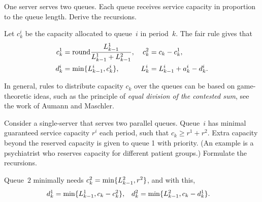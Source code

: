 \documentclass[queueing-book.tex]{subfiles}
\begin{document}
\begin{exercise} \label{ex:51}
 One server serves two queues. 
 Each queue receives service capacity in proportion to the queue length.
 Derive the recursions.
\begin{solution}
 Let $c_k^i$ be the capacity allocated to queue~$i$ in period~$k$. The fair rule gives that
 \begin{align*}
 c_k^1 &= \text{round} \frac{L_{k-1}^1}{L_{k-1}^1 + L_{k-1}^2}, &  c_k^2 &= c_k - c_k^1, \\
 d_k^i &= \min\{L_{k-1}^i, c^i_k\}, & L_k^i &= L_{k-1}^i+a_k^i - d_k^i.
 \end{align*}

 In general, rules to distribute capacity $c_k$ over the queues can be based on game-theoretic ideas, such as the principle of \textit{equal division of the contested sum}, see the work of  Aumann and Maschler.
\end{solution}
\end{exercise}


\begin{exercise}
 Consider  a single-server that serves two parallel queues.
Queue~$i$ has minimal guaranteed service capacity $r^i$ each  period, such that $c_k \geq r^1 + r^2$.
 Extra capacity beyond the reserved capacity is given to queue 1 with priority.
(An example is a psychiatrist who reserves capacity for different  patient groups.)
 Formulate the recursions.
\begin{solution}
  Queue~$2$ minimally needs $c_{k}^2 = \min\{L_{k-1}^2, r^2\}$, and with this,
  \begin{align*}
 d_{k}^1 &= \min\{L_{k-1}^1, c_k-c_{k}^2\}, & d_{k}^2 &= \min\{L_{k-1}^2, c_k-d_{k}^1\}.
  \end{align*}
\end{solution}
\end{exercise}



\end{document}
